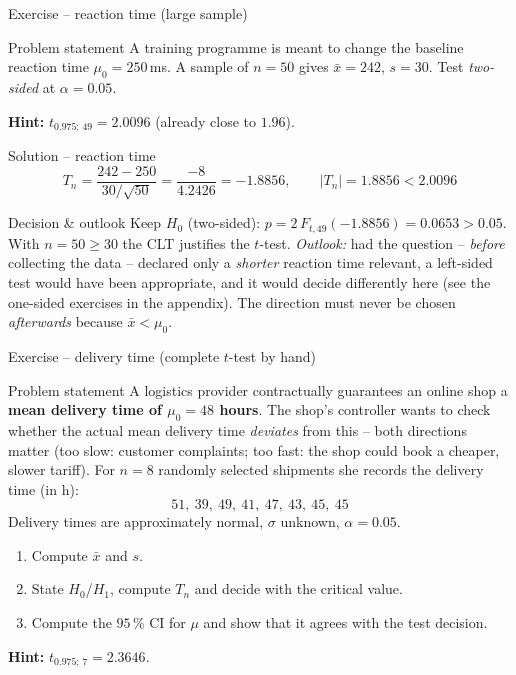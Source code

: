 \documentclass[aspectratio=169,11pt]{beamer}
\begin{document}
\begin{frame}{Exercise -- reaction time (large sample)}
  \begin{block}{Problem statement}
    A training programme is meant to change the baseline reaction time
    $\mu_0 = 250\,$ms. A sample of $n=50$ gives $\bar x = 242$, $s = 30$. Test
    \emph{two-sided} at $\alpha=0.05$.
  \end{block}
  \textbf{Hint:} $t_{0.975;\,49} = 2.0096$ (already close to $1.96$).
\end{frame}

\begin{frame}{Solution -- reaction time}
  \[
    T_n = \frac{242-250}{30/\sqrt{50}} = \frac{-8}{4.2426} = -1.8856,
    \qquad |T_n| = 1.8856 < 2.0096
  \]
  \begin{exampleblock}{Decision \& outlook}
    Keep $H_0$ (two-sided): $p = 2\,F_{t,49}(-1.8856) = \mathbf{0.0653} >
    0.05$. With $n=50\ge 30$ the CLT justifies the $t$-test.
    \emph{Outlook:} had the question -- \emph{before} collecting the data --
    declared only a \emph{shorter} reaction time relevant, a left-sided test
    would have been appropriate, and it would decide differently here (see the
    one-sided exercises in the appendix). The direction must never be chosen \emph{afterwards}
    because $\bar x<\mu_0$.
  \end{exampleblock}
\end{frame}

\begin{frame}{Exercise -- delivery time (complete $t$-test by hand)}
  \begin{block}{Problem statement}
    A logistics provider contractually guarantees an online shop a
    \textbf{mean delivery time of $\mu_0=48$ hours}. The shop's controller wants
    to check whether the actual mean delivery time \emph{deviates} from this --
    both directions matter (too slow: customer complaints; too fast: the shop
    could book a cheaper, slower tariff). For $n=8$ randomly selected
    shipments she records the delivery time (in h):
    \[
      51,\ 39,\ 49,\ 41,\ 47,\ 43,\ 45,\ 45
    \]
    Delivery times are approximately normal, $\sigma$ unknown, $\alpha=0.05$.
  \end{block}
  \begin{enumerate}\setlength{\itemsep}{1pt}
    \item[a)] Compute $\bar x$ and $s$.
    \item[b)] State $H_0$/$H_1$, compute $T_n$ and decide with the critical
              value.
    \item[c)] Compute the $95\,\%$ CI for $\mu$ and show that it agrees with
              the test decision.
  \end{enumerate}
  \textbf{Hint:} $t_{0.975;\,7}=2.3646$.
\end{frame}
\end{document}
